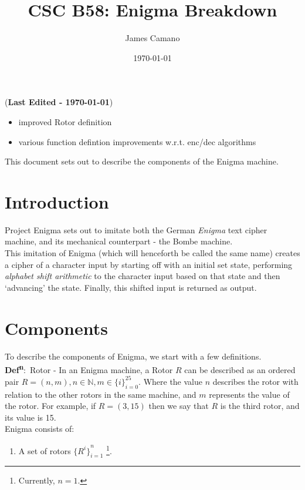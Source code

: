 \documentclass[12pt,a4paper]{article}
\title{CSC B58: Enigma Breakdown}
\date{\today}
\author{James Camano}
\newcommand{\lastedited}{(\textbf{Last Edited - \today{}})}
\newcommand{\defn}[1]{\textbf{Def\textsuperscript{n}}:\ #1 - }
\newcommand{\validshifts}{\{i\}_{i=0}^{25}}
\begin{document}
	\maketitle
	\lastedited
	\begin{itemize}
		\item improved Rotor definition
		\item various function defintion improvements w.r.t. enc/dec algorithms
	\end{itemize}

	This document sets out to describe the components of the Enigma machine. \\
	\section{Introduction}
 	Project Enigma sets out to imitate both the German \emph{Enigma} text cipher machine, and its mechanical counterpart - the Bombe machine.  \\

	This imitation of Enigma (which will henceforth be called the same name) creates a cipher of a character input by starting off with an initial set state, performing \emph{alphabet shift arithmetic} to the character input based on that state and then `advancing' the state. Finally, this shifted input is returned as output.
	
	\section{Components}
	To describe the components of Enigma, we start with a few definitions. \\

	\defn{Rotor} In an Enigma machine, a Rotor $R$ can be described as an ordered pair $R = (n, m),  n \in \mathbb{N},  m \in \validshifts$. Where the value $n$ describes the rotor with relation to the other rotors in the same machine, and $m$ represents the value of the rotor. For example, if $R = (3, 15)$ then we say that $R$ is the third rotor, and its value is 15. \\

	Enigma consists of:

	\begin{enumerate}
		\item A set of rotors ${\{R^i\}}_{i=1}^{n}$ \footnote{Currently, $n=1$. }. 
	\end{enumerate}
\end{document}
